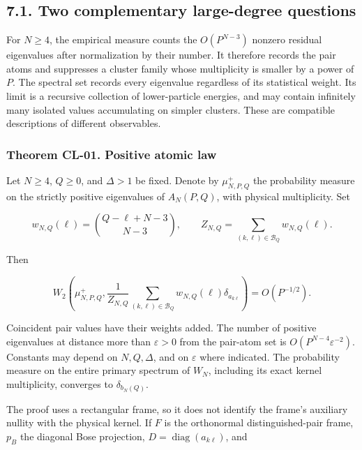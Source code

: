 \documentclass[a4paper,11pt]{article}
\numberwithin{equation}{section}
\begin{document}
\hypertarget{two-complementary-large-degree-questions}{%
\subsection{7.1. Two complementary large-degree questions}\label{two-complementary-large-degree-questions}}

For \(N\geq4\), the empirical measure counts the \(O(P^{N-3})\) nonzero residual eigenvalues after normalization by their number. It therefore records the pair atoms and suppresses a cluster family whose multiplicity is smaller by a power of \(P\). The spectral set records every eigenvalue regardless of its statistical weight. Its limit is a recursive collection of lower-particle energies, and may contain infinitely many isolated values accumulating on simpler clusters. These are compatible descriptions of different observables.

\hypertarget{theorem-cl-01.-positive-atomic-law}{%
\subsubsection{Theorem CL-01. Positive atomic law}\label{theorem-cl-01.-positive-atomic-law}}

Let \(N\geq4\), \(Q\geq0\), and \(\Delta>1\) be fixed. Denote by \(\mu^+_{N,P,Q}\) the probability measure on the strictly positive eigenvalues of \(A_N(P,Q)\), with physical multiplicity. Set

\[
w_{N,Q}(\ell)=\binom{Q-\ell+N-3}{N-3},\qquad
 Z_{N,Q}=\sum_{(k,\ell)\in\mathcal B_Q}w_{N,Q}(\ell).
\]

Then

\[
W_2\!\left(\mu^+_{N,P,Q},\frac1{Z_{N,Q}}
\sum_{(k,\ell)\in\mathcal B_Q}w_{N,Q}(\ell)\delta_{a_{k\ell}}\right)
=O(P^{-1/2}).
\tag{CL.2}
\]

Coincident pair values have their weights added. The number of positive eigenvalues at distance more than \(\varepsilon>0\) from the pair-atom set is \(O(P^{N-4}\varepsilon^{-2})\). Constants may depend on \(N,Q,\Delta\), and on \(\varepsilon\) where indicated. The probability measure on the entire primary spectrum of \(W_N\), including its exact kernel multiplicity, converges to \(\delta_{b_N(Q)}\).

The proof uses a rectangular frame, so it does not identify the frame's auxiliary nullity with the physical kernel. If \(F\) is the orthonormal distinguished-pair frame, \(p_B\) the diagonal Bose projection, \(D=\operatorname{diag}(a_{k\ell})\), and
\end{document}
